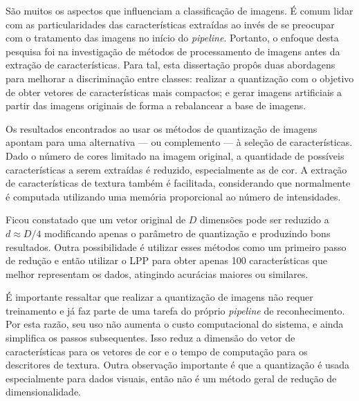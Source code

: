 
São muitos os aspectos que influenciam a classificação de imagens. É comum lidar com as particularidades das características extraídas ao invés de se preocupar com o tratamento das imagens no início do \textit{pipeline}. Portanto, o enfoque desta pesquisa foi na investigação de métodos de processamento de imagens antes da extração de características. Para tal, esta dissertação propôs duas abordagens para melhorar a discriminação entre classes: realizar a quantização com o objetivo de obter vetores de características mais compactos; e gerar imagens artificiais a partir das imagens originais de forma a rebalancear a base de imagens.

Os resultados encontrados ao usar os métodos de quantização de imagens apontam para uma alternativa --- ou complemento --- à seleção de características. Dado o número de cores limitado na imagem original, a quantidade de possíveis características a serem extraídas é reduzido, especialmente as de cor. A extração de características de textura também é facilitada, considerando que normalmente é computada utilizando uma memória proporcional ao número de intensidades.

Ficou constatado que um vetor original de $D$ dimensões pode ser reduzido a $d \approx D/4$ modificando apenas o parâmetro de quantização e produzindo bons resultados. Outra possibilidade é utilizar esses métodos como um primeiro passo de redução e então utilizar o LPP para obter apenas 100 características que melhor representam os dados, atingindo acurácias maiores ou similares.

É importante ressaltar que realizar a quantização de imagens não requer treinamento e já faz parte de uma tarefa do próprio \textit{pipeline} de reconhecimento. Por esta razão, seu uso não aumenta o custo computacional do sistema, e ainda simplifica os passos subsequentes. Isso reduz a dimensão do vetor de características para os vetores de cor e o tempo de computação para os descritores de textura. Outra observação importante é que a quantização é usada especialmente para dados visuais, então não é um método geral de redução de dimensionalidade.

